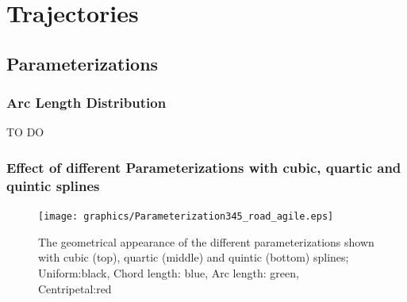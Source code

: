 
\chapter{Trajectories}
\label{cha:appendix}

\section{Parameterizations}
\subsection{Arc Length Distribution}
\label{subsec:arcLengthDistribution}
TO DO
\subsection{Effect of different Parameterizations with cubic, quartic and quintic splines}
\label{subsec:parameterization_degree}

\begin{figure}[H]
  \begin{minipage}[t]{0.9\textwidth}
    \texttt{[image: graphics/Parameterization345\_road\_agile.eps]}
  \end{minipage}
  \caption{The geometrical appearance of the different parameterizations shown with cubic (top), quartic (middle) and quintic (bottom) splines; Uniform:black, Chord length: blue, Arc length: green, Centripetal:red}
  \label{fig:parameterization_cqq}
\end{figure}

